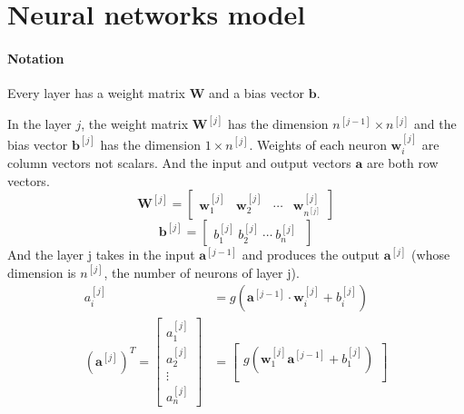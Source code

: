 \section{Neural networks model}
\begin{notebox}
    \paragraph*{Notation}
    Every layer has a weight matrix $\mathbf{W}$ and a bias vector $\mathbf{b}$.\par
    \hspace{2em}In the layer $j$, the weight matrix $\mathbf{W}^{[j]}$ 
    has the dimension $n^{[j-1]} \times n^{[j]}$ and the bias vector $\mathbf{b}^{[j]}$ has the dimension $1 \times n^{[j]}$.
    Weights of each neuron $\mathbf{w}_i^{[j]}$ are column vectors not scalars. And the input and output vectors $\mathbf{a}$ 
    are both row vectors.
    \begin{equation}
        \mathbf{W}^{[j]} = \begin{bmatrix}
            \mathbf{w}_1^{[j]} & \mathbf{w}_2^{[j]} & \cdots & \mathbf{w}_{n^{[j]}}^{[j]}
        \end{bmatrix}
    \end{equation}
    \begin{equation}
        \mathbf{b}^{[j]} = \begin{bmatrix}
            b_{1}^{[j]}\
            b_{2}^{[j]}\ 
            \cdots\ 
            b_{n}^{[j]}\
        \end{bmatrix}
    \end{equation}
    \hspace{2em}And the layer j takes in the input $\mathbf{a}^{[j-1]}$ and produces the output $\mathbf{a}^{[j]}$ (whose dimension is 
    $n^{[j]}$, the number of neurons of layer j).
    \begin{align}
        a_i^{[j]} &= g(\mathbf{a}^{[j-1]} \cdot \mathbf{w}_i^{[j]} + b_i^{[j]})\\
        (\mathbf{a}^{[j]})^{T} = \begin{bmatrix}
            a_1^{[j]} \\
            a_2^{[j]} \\
            \vdots \\
            a_n^{[j]}
        \end{bmatrix} &=
        \begin{bmatrix}
            g(\mathbf{w}_1^{[j]}\mathbf{a}^{[j-1]} + b_1^{[j]})\\

\end{bmatrix}
\end{align}
\end{notebox}
